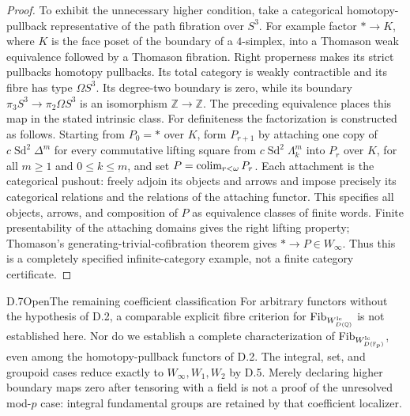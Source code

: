\begin{proof}
To exhibit the unnecessary higher condition, take a categorical homotopy-pullback representative of the path fibration over $S^3$. For example factor $*\to K$, where $K$ is the face poset of the boundary of a $4$-simplex, into a Thomason weak equivalence followed by a Thomason fibration. Right properness makes its strict pullbacks homotopy pullbacks. Its total category is weakly contractible and its fibre has type $\Omega S^3$. Its degree-two boundary is zero, while its boundary $\pi_3S^3\to\pi_2\Omega S^3$ is an isomorphism $\mathbb Z\to\mathbb Z$. The preceding equivalence places this map in the stated intrinsic class. For definiteness the factorization is constructed as follows. Starting from $P_0=*$ over $K$, form $P_{r+1}$ by attaching one copy of $c\operatorname{Sd}^2\Delta^m$ for every commutative lifting square from $c\operatorname{Sd}^2\Lambda_k^m$ into $P_r$ over $K$, for all $m\geq1$ and $0\leq k\leq m$, and set $P=\operatorname{colim}_{r<\omega}P_r$. Each attachment is the categorical pushout: freely adjoin its objects and arrows and impose precisely its categorical relations and the relations of the attaching functor. This specifies all objects, arrows, and composition of $P$ as equivalence classes of finite words. Finite presentability of the attaching domains gives the right lifting property; Thomason's generating-trivial-cofibration theorem gives $*\to P\in W_\infty$. Thus this is a completely specified infinite-category example, not a finite category certificate.
\end{proof}

\begin{claim}{D.7}{Open}{The remaining coefficient classification}
For arbitrary functors without the hypothesis of D.2, a comparable explicit fibre criterion for $\mathrm{Fib}_{W_{D(\mathbb Q)}^{\mathrm{lc}}}$ is not established here. Nor do we establish a complete characterization of $\mathrm{Fib}_{W_{D(\mathbb F_p)}^{\mathrm{lc}}}$, even among the homotopy-pullback functors of D.2. The integral, set, and groupoid cases reduce exactly to $W_\infty,W_1,W_2$ by D.5. Merely declaring higher boundary maps zero after tensoring with a field is not a proof of the unresolved mod-$p$ case: integral fundamental groups are retained by that coefficient localizer.
\end{claim}

